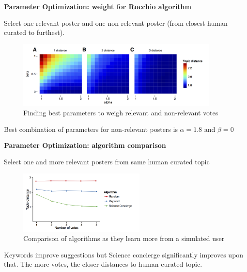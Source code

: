 \begin{frame}{\textbf{Parameter Optimization: weight for Rocchio algorithm}}

Select one relevant poster and one non-relevant poster (from closest human curated to furthest).

\begin{figure}
\includegraphics[width=4.0in]{images/alpha_beta_relation_plot}\\
\tiny{Finding best parameters to weigh relevant and non-relevant votes}
\end{figure}

Best combination of parameters for non-relevant posters is $\alpha=1.8$ and $\beta=0$

\end{frame}


\begin{frame}{\textbf{Parameter Optimization: algorithm comparison}}

Select one and more relevant posters from same human curated topic

\begin{figure}
\includegraphics[width=2.5in]{images/performance_vs_votes}\\
\tiny{Comparison of algorithms as they learn more from a simulated user}
\end{figure}

Keywords improve suggestions but Science concierge significantly improves upon that. The more votes, the closer distances to human curated topic.

\end{frame}


